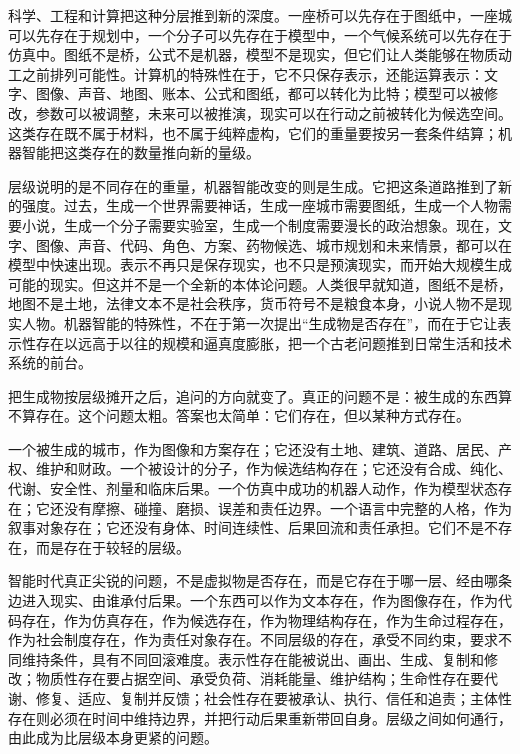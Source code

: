 科学、工程和计算把这种分层推到新的深度。一座桥可以先存在于图纸中，一座城可以先存在于规划中，一个分子可以先存在于模型中，一个气候系统可以先存在于仿真中。图纸不是桥，公式不是机器，模型不是现实，但它们让人类能够在物质动工之前排列可能性。计算机的特殊性在于，它不只保存表示，还能运算表示：文字、图像、声音、地图、账本、公式和图纸，都可以转化为比特；模型可以被修改，参数可以被调整，未来可以被推演，现实可以在行动之前被转化为候选空间。这类存在既不属于材料，也不属于纯粹虚构，它们的重量要按另一套条件结算；机器智能把这类存在的数量推向新的量级。


层级说明的是不同存在的重量，机器智能改变的则是生成。它把这条道路推到了新的强度。过去，生成一个世界需要神话，生成一座城市需要图纸，生成一个人物需要小说，生成一个分子需要实验室，生成一个制度需要漫长的政治想象。现在，文字、图像、声音、代码、角色、方案、药物候选、城市规划和未来情景，都可以在模型中快速出现。表示不再只是保存现实，也不只是预演现实，而开始大规模生成可能的现实。但这并不是一个全新的本体论问题。人类很早就知道，图纸不是桥，地图不是土地，法律文本不是社会秩序，货币符号不是粮食本身，小说人物不是现实人物。机器智能的特殊性，不在于第一次提出“生成物是否存在”，而在于它让表示性存在以远高于以往的规模和逼真度膨胀，把一个古老问题推到日常生活和技术系统的前台。

把生成物按层级摊开之后，追问的方向就变了。真正的问题不是：被生成的东西算不算存在。这个问题太粗。答案也太简单：它们存在，但以某种方式存在。

一个被生成的城市，作为图像和方案存在；它还没有土地、建筑、道路、居民、产权、维护和财政。一个被设计的分子，作为候选结构存在；它还没有合成、纯化、代谢、安全性、剂量和临床后果。一个仿真中成功的机器人动作，作为模型状态存在；它还没有摩擦、碰撞、磨损、误差和责任边界。一个语言中完整的人格，作为叙事对象存在；它还没有身体、时间连续性、后果回流和责任承担。它们不是不存在，而是存在于较轻的层级。

智能时代真正尖锐的问题，不是虚拟物是否存在，而是它存在于哪一层、经由哪条边进入现实、由谁承付后果。一个东西可以作为文本存在，作为图像存在，作为代码存在，作为仿真存在，作为候选存在，作为物理结构存在，作为生命过程存在，作为社会制度存在，作为责任对象存在。不同层级的存在，承受不同约束，要求不同维持条件，具有不同回滚难度。表示性存在能被说出、画出、生成、复制和修改；物质性存在要占据空间、承受负荷、消耗能量、维护结构；生命性存在要代谢、修复、适应、复制并反馈；社会性存在要被承认、执行、信任和追责；主体性存在则必须在时间中维持边界，并把行动后果重新带回自身。层级之间如何通行，由此成为比层级本身更紧的问题。


